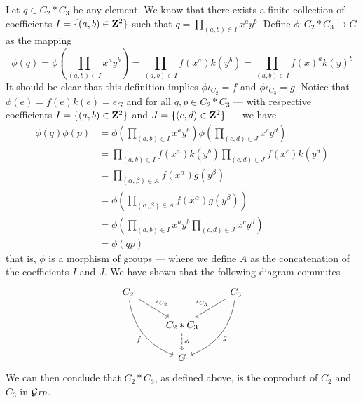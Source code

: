 \begin{remark}
  Let \(q \in C_2 * C_3\) be any element. We know that there exists a finite
  collection of coefficients \(I = \{(a, b) \in \mathbf{Z}^2\}\) such that \(q =
  \prod_{(a, b) \in I} x^a y^b\). Define \(\phi: C_2 * C_3 \to G\) as the
  mapping
  \[
    \phi(q) = \phi\left(\prod_{(a, b) \in I} x^a y^b\right)
    = \prod_{(a, b) \in I} f(x^a) k(y^b)
    = \prod_{(a, b) \in I} f(x)^a k(y)^b
  \]
  It should be clear that this definition implies \(\phi \iota_{C_2} = f\) and
  \(\phi \iota_{C_3} = g\). Notice that \(\phi(e) = f(e) k(e) = e_G\) and for
  all \(q, p \in C_2 * C_3\) --- with respective coefficients \(I = \{(a, b) \in
  \mathbf{Z}^2\}\) and \(J = \{(c,d) \in \mathbf{Z}^2\}\) --- we have
  \begin{align*}
    \phi(q) \phi(p)
    &= \phi\left( \prod_{(a, b) \in I} x^a y^b \right)
    \phi\left( \prod_{(c, d) \in J} x^c y^d \right)
    \\
    &= \prod_{(a, b) \in I} f(x^a) k(y^b)
    \prod_{(c, d) \in J} f(x^c) k(y^d)
    \\
    &= \prod_{(\alpha, \beta) \in A} f(x^\alpha) g(y^\beta)
    \\
    &= \phi\left(\prod_{(\alpha, \beta) \in A} f(x^\alpha) g(y^\beta) \right)
    \\
    &= \phi\left(\prod_{(a, b) \in I} x^a y^b
      \prod_{(c, d) \in J} x^c y^d\right)
    \\
    &= \phi(qp)
  \end{align*}
  that is, \(\phi\) is a morphism of groups --- where we define \(A\) as the
  concatenation of the coefficients \(I\) and \(J\). We have shown that the
  following diagram commutes
  \[
    \begin{tikzcd}
      C_2 \ar[dr, "\iota_{C_2}"] \ar[ddr, swap, bend right, "f"]
      & &C_3 \ar[dl, swap, "\iota_{C_3}"] \ar[ddl, bend left, "g"] \\
      &C_2 * C_3 \ar[d, dashed, "\phi"] & \\
      &G &
    \end{tikzcd}
  \]
  We can then conclude that \(C_2 * C_3\), as defined above, is the coproduct of
  \(C_2\) and \(C_3\) in \({\mathcal{G}\textit{rp}}\).
\end{remark}

